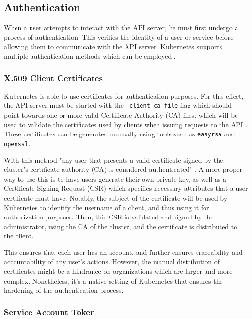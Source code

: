 \documentclass[a4paper,11pt,openright,BCOR=15mm]{scrbook}
\begin{document}
\subsection{Authentication}
\label{subsec:auth}

When a user attempts to interact with the API server, he must first undergo a process of authentication. This verifies the identity of a user or service before allowing them to communicate with the API server. Kubernetes supports multiple authentication methods which can be employed \cite{the_linux_foundation_authenticating_2024}.

\subsubsection{X.509 Client Certificates}

Kubernetes is able to use certificates for authentication purposes. For this effect, the API server must be started with the \texttt{--client-ca-file} flag which should point towards one or more valid Certificate Authority (CA) files, which will be used to validate the certificates used by clients when issuing requests to the API \cite{the_linux_foundation_authenticating_2024}. These certificates can be generated manually using tools such as \texttt{easyrsa} and \texttt{openssl}.

With this method "any user that presents a valid certificate signed by the cluster's certificate authority (CA) is considered authenticated" \cite{the_linux_foundation_authenticating_2024}. A more proper way to use this is to have users generate their own private key, as well as a Certificate Signing Request (CSR) which specifies necessary attributes that a user certificate must have. Notably, the subject of the certificate will be used by Kubernetes to identify the username of a client, and thus using it for authorization purposes. Then, this CSR is validated and signed by the administrator, using the CA of the cluster, and the certificate is distributed to the client.

This ensures that each user has an account, and further ensures traceability and accountability of any user's actions. However, the manual distribution of certificates might be a hindrance on organizations which are larger and more complex. Nonetheless, it's a native setting of Kubernetes that ensures the hardening of the authentication process. 

\subsubsection{Service Account Token}
\end{document}
